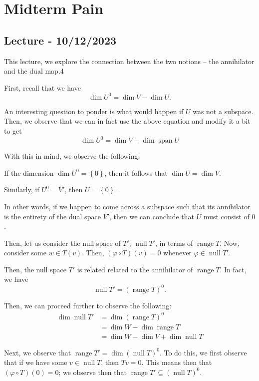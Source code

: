 \documentclass[openany]{book}
\DeclareMathOperator*{\vspan}{span}
\DeclareMathOperator*{\vnull}{null}
\DeclareMathOperator*{\vrange}{range}
\begin{document}
\chapter{Midterm Pain}
\section{Lecture - 10/12/2023}
This lecture, we explore the connection between the two notions -- the annihilator and the dual map.4

First, recall that we have
\begin{equation*}
	\dim U^{0} =\dim V - \dim U.
\end{equation*}

An interesting question to ponder is what would happen if $U$ was not a subspace. Then, we observe that we can in fact use the above equation and modify it a bit to get
\begin{equation*}
	\dim U^{0} = \dim V - \dim \vspan U
\end{equation*}

With this in mind, we observe the following:
\begin{cor}
	If the dimension $\dim U^{0} = \left\{  0\right\}$, then it follows that $\dim U = \dim V$.
	
	Similarly, if $U^{0} = V'$, then $U = \left\{  0 \right\}$.
\end{cor}

In other words, if we happen to come across a subspace such that its annihilator is the entirety of the dual space $V'$, then we can conclude that $U$ must consist of $0$.

Then, let us consider the null space of $T'$, $\vnull T'$, in terms of $\vrange T$. Now, consider some $w \in T(v)$. Then, $(\varphi \circ T)(v) = 0$ whenever $\varphi \in \vnull T'$.

Then, the null space $T'$ is related related to the annihilator of $\vrange T$. In fact, we have
\begin{equation*}
	\vnull T' = (\vrange T)^{0}.
\end{equation*}

Then, we can proceed further to observe the following:
\begin{align*}
	\dim \vnull T' &= \dim (\vrange T)^{0} \\
	&= \dim W - \dim \vrange T \\
	&= \dim W - \dim V + \dim \vnull T 
\end{align*}

Next, we observe that $\vrange T' = \dim (\vnull T)^{0}$. To do this, we first observe that if we have some $v \in \vnull T$, then $Tv = 0$. This means then that $(\varphi \circ T)(0) = 0$; we observe then that $\vrange T' \subseteq (\vnull T)^{0}$.
\end{document}
